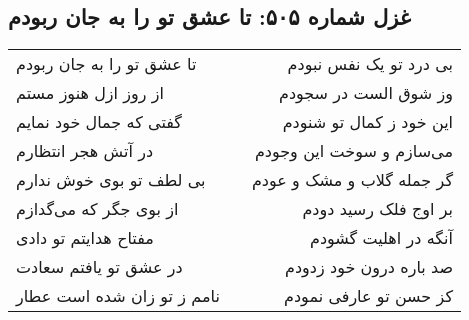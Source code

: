 \begin{center}
\section*{غزل شماره ۵۰۵: تا عشق تو را به جان ربودم}
\label{sec:505}
\begin{longtable}{l p{0.5cm} r}
تا عشق تو را به جان ربودم
&&
بی درد تو یک نفس نبودم
\\
از روز ازل هنوز مستم
&&
وز شوق الست در سجودم
\\
گفتی که جمال خود نمایم
&&
این خود ز کمال تو شنودم
\\
در آتش هجر انتظارم
&&
می‌سازم و سوخت این وجودم
\\
بی لطف تو بوی خوش ندارم
&&
گر جمله گلاب و مشک و عودم
\\
از بوی جگر که می‌گدازم
&&
بر اوج فلک رسید دودم
\\
مفتاح هدایتم تو دادی
&&
آنگه در اهلیت گشودم
\\
در عشق تو یافتم سعادت
&&
صد باره درون خود زدودم
\\
نامم ز تو زان شده است عطار
&&
کز حسن تو عارفی نمودم
\\
\end{longtable}
\end{center}
